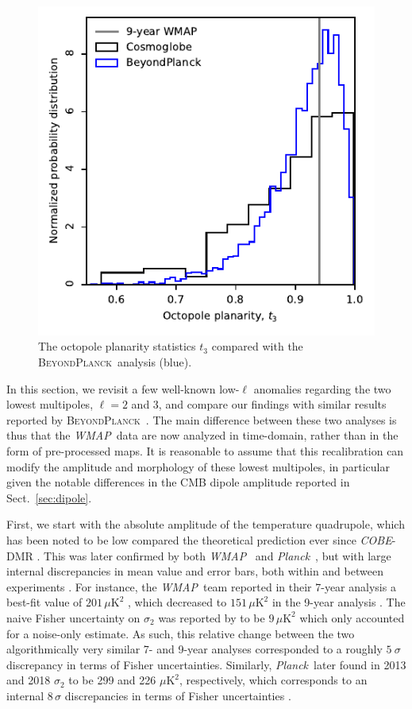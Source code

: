 \documentclass[twocolumn]{../../common/aa}
\def\WMAP{\emph{WMAP}}
\def\COBE{\emph{COBE}}
\def\planck{\emph{Planck}}
\def\Planck{\emph{Planck}}
\newcommand{\BP}{\textsc{BeyondPlanck}}
\newcommand{\bp}{\textsc{BeyondPlanck}}
\begin{document}
\begin{figure}[t]
	\includegraphics[width=\columnwidth]{figures/WMAP_t_3.pdf}
	\caption{The octopole planarity statistics $t_3$ compared with the \BP\ analysis (blue).}
        \label{fig:planarity}        
\end{figure}

In this section, we revisit a few well-known low-$\ell$ anomalies regarding the two lowest multipoles, $\ell=2$ and 3, and compare our findings with similar results reported by \bp\ \citep{bp11}. The main difference between these two analyses is thus that the \WMAP\ data are now analyzed in time-domain, rather than in the form of pre-processed maps. It is reasonable to assume that this recalibration can modify the amplitude and morphology of these lowest multipoles, in particular given the notable differences in the CMB dipole amplitude reported in Sect.~\ref{sec:dipole}.

First, we start with the absolute amplitude of the temperature quadrupole, which has been noted to be low compared the theoretical prediction ever since \COBE-DMR \citep{bennett:1992}. This was later confirmed by both \WMAP\ \citep{hinshaw2003a} and \planck\ \citep{planck2013-XV}, but with large internal discrepancies in mean value and error bars, both within and between experiments \citep{bp11}. For instance, the \WMAP\ team reported in their 7-year analysis a best-fit value of $201\,\mu\mathrm{K}^2$ \citep{larson2010}, which decreased to $151\,\mu\mathrm{K}^2$ in the 9-year analysis \citep{hinshaw2012}. The naive Fisher uncertainty on $\sigma_2$ was reported by \citet{hinshaw2012} to be $9\,\mu \mathrm{K}^2$ which only accounted for a noise-only estimate. As such, this relative change between the two algorithmically very similar 7- and 9-year analyses corresponded to a roughly $5~\sigma$ discrepancy in terms of Fisher uncertainties. Similarly, \Planck\ later found in 2013 and 2018 $\sigma_2$ to be 299 and 226 $\mu \mathrm{K}^2$, respectively, which corresponds to an internal $8\,\sigma$ discrepancies in terms of Fisher uncertainties \citep{planck2016-l05}.
\end{document}
